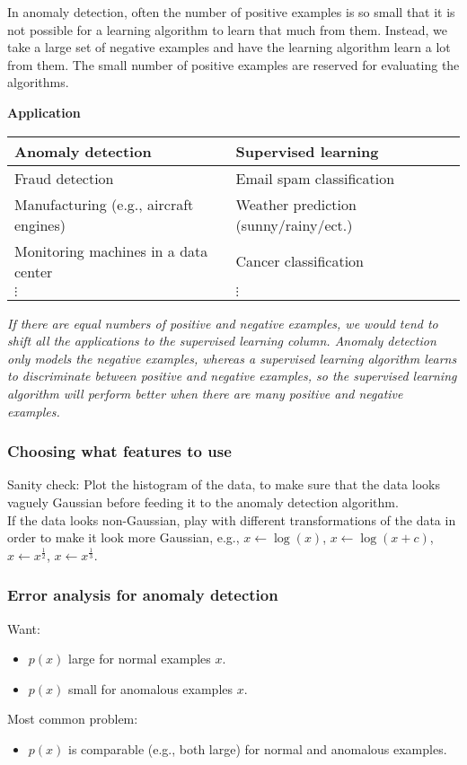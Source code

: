 In anomaly detection, often the number of positive examples is so small that it is not possible for a learning algorithm to learn that much from them. Instead, we take a large set of negative examples and have the learning algorithm learn a lot from them. The small number of positive examples are reserved for evaluating the algorithms.

\textbf{Application}
\begin{center}
\begin{tabular}{| m{7cm} | m{7cm} | }
\hline
Anomaly detection & Supervised learning\\
\hline
Fraud detection & Email spam classification\\
\hline
Manufacturing (e.g., aircraft engines) & Weather prediction (sunny/rainy/ect.)\\
Monitoring machines in a data center & Cancer classification\\
$\vdots$ & $\vdots$ \\
\hline
\end{tabular}
\end{center}

\emph{\textcolor{Bittersweet}{If there are equal numbers of positive and negative examples, we would tend to shift all the applications to the supervised learning column. Anomaly detection only models the negative examples, whereas a supervised learning algorithm learns to discriminate between positive and negative examples, so the supervised learning algorithm will perform better when there are many positive and negative examples.}}

\subsubsection{Choosing what features to use}
Sanity check: Plot the histogram of the data, to make sure that the data looks vaguely Gaussian before feeding it to the anomaly detection algorithm.\\
If the data looks non-Gaussian, play with different transformations of the data in order to make it look more Gaussian, e.g., $x \leftarrow \log(x)$, $x \leftarrow \log(x + c)$, $x \leftarrow x^{\frac{1}{2}}$,  $x \leftarrow x^{\frac{1}{3}}$.

\subsubsection{Error analysis for anomaly detection}
Want:
\begin{itemize}
\item[]
$p(x)$ large for normal examples $x$.
\item[]
$p(x)$ small for anomalous examples $x$.
\end{itemize}
Most common problem:
\begin{itemize}
\item[]
$p(x)$ is comparable (e.g., both large) for normal and anomalous examples.
\end{itemize}

